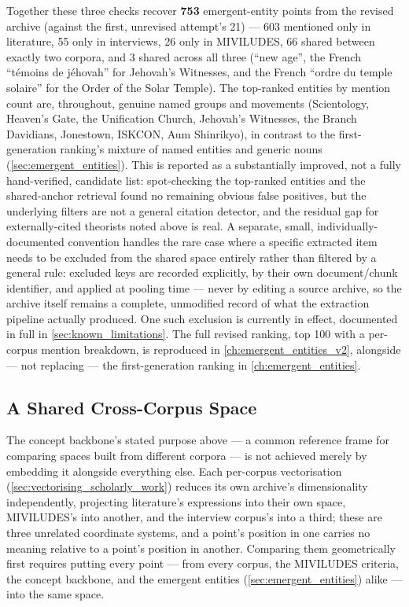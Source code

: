 Together these three checks recover \textbf{753} emergent-entity points from the revised archive (against the first, unrevised attempt's 21) — 603 mentioned only in literature, 55 only in interviews, 26 only in MIVILUDES, 66 shared between exactly two corpora, and 3 shared across all three (\enquote{new age}, the French \enquote{témoins de jéhovah} for Jehovah's Witnesses, and the French \enquote{ordre du temple solaire} for the Order of the Solar Temple). The top-ranked entities by mention count are, throughout, genuine named groups and movements (Scientology, Heaven's Gate, the Unification Church, Jehovah's Witnesses, the Branch Davidians, Jonestown, ISKCON, Aum Shinrikyo), in contrast to the first-generation ranking's mixture of named entities and generic nouns (\ref{sec:emergent_entities}). This is reported as a substantially improved, not a fully hand-verified, candidate list: spot-checking the top-ranked entities and the shared-anchor retrieval found no remaining obvious false positives, but the underlying filters are not a general citation detector, and the residual gap for externally-cited theorists noted above is real. A separate, small, individually-documented convention handles the rare case where a specific extracted item needs to be excluded from the shared space entirely rather than filtered by a general rule: excluded keys are recorded explicitly, by their own document/chunk identifier, and applied at pooling time — never by editing a source archive, so the archive itself remains a complete, unmodified record of what the extraction pipeline actually produced. One such exclusion is currently in effect, documented in full in \ref{sec:known_limitations}. The full revised ranking, top 100 with a per-corpus mention breakdown, is reproduced in \ref{ch:emergent_entities_v2}, alongside — not replacing — the first-generation ranking in \ref{ch:emergent_entities}.

\subsection{A Shared Cross-Corpus Space}\label{sec:shared_space}
The concept backbone's stated purpose above — a common reference frame for comparing spaces built from different corpora — is not achieved merely by embedding it alongside everything else. Each per-corpus vectorisation (\ref{sec:vectorising_scholarly_work}) reduces its own archive's dimensionality independently, projecting literature's expressions into their own space, MIVILUDES's into another, and the interview corpus's into a third; these are three unrelated coordinate systems, and a point's position in one carries no meaning relative to a point's position in another. Comparing them geometrically first requires putting every point — from every corpus, the MIVILUDES criteria, the concept backbone, and the emergent entities (\ref{sec:emergent_entities}) alike — into the same space.


